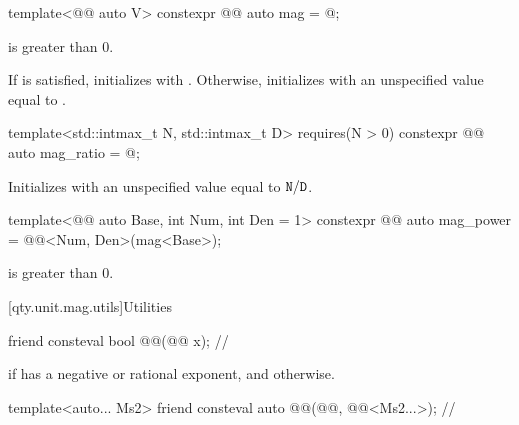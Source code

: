 \begin{itemdecl}
template<@@ auto V>
constexpr @@ auto mag = @\seebelownc@;
\end{itemdecl}

\begin{itemdescr}
\pnum
\constraints
{} is greater than $0$.

\pnum
\effects
If  is satisfied,
initializes  with .
Otherwise, initializes  with
an unspecified value equal to .
\end{itemdescr}

\begin{itemdecl}
template<std::intmax_t N, std::intmax_t D>
  requires(N > 0)
constexpr @@ auto mag_ratio = @\seebelownc@;
\end{itemdecl}

\begin{itemdescr}
\pnum
\effects
Initializes  with
an unspecified value equal to $\texttt{\protect N}/\texttt{\protect D}$.
\end{itemdescr}

\begin{itemdecl}
template<@@ auto Base, int Num, int Den = 1>
constexpr @@ auto mag_power = @@<Num, Den>(mag<Base>);
\end{itemdecl}

\begin{itemdescr}
\pnum
\constraints
{} is greater than $0$.
\end{itemdescr}

[qty.unit.mag.utils]{Utilities}

\begin{itemdecl}
friend consteval bool @@(@@ x);              // \expos
\end{itemdecl}

\begin{itemdescr}
\pnum
\returns
{} if  has a negative or rational exponent, and
 otherwise.
\end{itemdescr}

\begin{itemdecl}
template<auto... Ms2>
friend consteval auto @@(@@, @@<Ms2...>);  // \expos
\end{itemdecl}

